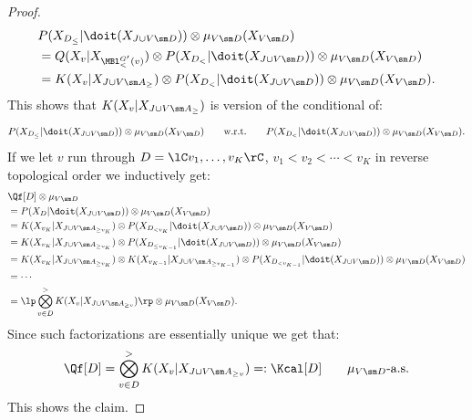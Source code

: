 \begin{Thm}
\begin{proof}
\begin{align*}
            & P(X_{D_\le}|\doit(X_{J \cup V \sm D})) \otimes \mu_{V\sm D}(X_{V \sm D}) \\
        & = Q(X_v|X_{\MBl^{G'}_<(v)}) \otimes P(X_{D_<}|\doit(X_{J \cup V \sm D})) \otimes \mu_{V\sm D}(X_{V \sm D}) \\
        & = K(X_v|X_{J \cup V \sm A_\ge}) \otimes P(X_{D_<}|\doit(X_{J \cup V \sm D})) \otimes \mu_{V\sm D}(X_{V \sm D}).
    \end{align*}
       This shows that $K(X_v|X_{J \cup V \sm A_\ge})$ is version of the conditional of:
               \[ P(X_{D_\le}|\doit(X_{J \cup V \sm D})) \otimes \mu_{V\sm D}(X_{V\sm D}) \qquad \text{w.r.t.} \qquad
        P(X_{D_<}|\doit(X_{J \cup V \sm D})) \otimes \mu_{V\sm D}(X_{V\sm D}). \] 
       If we let $v$ run through $D = \lC v_1,\dots,v_K \rC$, $v_1 < v_2 < \cdots < v_K$ 
       in reverse topological order we inductively get:
       \begin{align*}
           & \Qf[D] \otimes \mu_{V\sm D} \\
           &= P(X_D|\doit(X_{J \cup V \sm D})) \otimes \mu_{V\sm D}(X_{V\sm D}) \\
           &= K(X_{v_K}|X_{J \cup V \sm A_{\ge v_K}}) \otimes P(X_{D_{< v_{K}}}|\doit(X_{J \cup V \sm D})) \otimes \mu_{V\sm D}(X_{V\sm D})\\ 
           &= K(X_{v_K}|X_{J \cup V \sm A_{\ge v_K}}) \otimes P(X_{D_{\le v_{K-1}}}|\doit(X_{J \cup V \sm D})) \otimes \mu_{V\sm D}(X_{V\sm D})\\ 
           &= K(X_{v_K}|X_{J \cup V \sm A_{\ge v_K}}) \otimes  K(X_{v_{K-1}}|X_{J \cup V \sm A_{\ge v_{K-1}}}) \otimes P(X_{D_{< v_{K-1}}}|\doit(X_{J \cup V \sm D})) \otimes \mu_{V\sm D}(X_{V\sm D})\\ 
           & = \cdots\\
           &= \lp \bigotimes_{v \in D}^> K(X_v|X_{J \cup V \sm A_{\ge v}}) \rp \otimes \mu_{V\sm D}(X_{V\sm D}). 
       \end{align*}
       Since such factorizations are essentially unique we get that:
       \[ \Qf[D] = \bigotimes_{v \in D}^> K(X_v|X_{J \cup V \sm A_{\ge v}}) =: \Kcal[D] \qquad \mu_{V\sm D}\text{-a.s.}  \]
       This shows the claim.


\end{proof}
\end{Thm}

